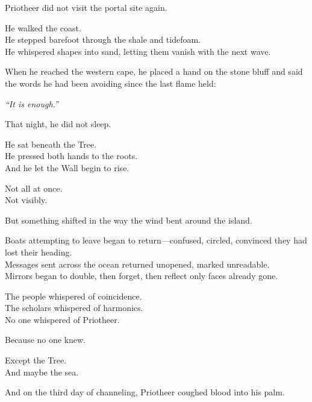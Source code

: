\documentclass[12pt]{article}
\begin{document}
\vspace{0.5em}
Priotheer did not visit the portal site again.

\vspace{0.5em}
He walked the coast.\\
He stepped barefoot through the shale and tidefoam.\\
He whispered shapes into sand, letting them vanish with the next wave.

\vspace{0.5em}
When he reached the western cape, he placed a hand on the stone bluff and said the words he had been avoiding since the last flame held:

\vspace{0.5em}
\textit{``It is enough.''}

\vspace{0.5em}
That night, he did not sleep.

\vspace{0.5em}
He sat beneath the Tree.\\
He pressed both hands to the roots.\\
And he let the Wall begin to rise.

\vspace{0.5em}
Not all at once.\\
Not visibly.

\vspace{0.5em}
But something shifted in the way the wind bent around the island.

\vspace{0.5em}
Boats attempting to leave began to return---confused, circled, convinced they had lost their heading.\\
Messages sent across the ocean returned unopened, marked unreadable.\\
Mirrors began to double, then forget, then reflect only faces already gone.

\vspace{0.5em}
The people whispered of coincidence.\\
The scholars whispered of harmonics.\\
No one whispered of Priotheer.

\vspace{0.5em}
Because no one knew.

\vspace{0.5em}
Except the Tree.\\
And maybe the sea.

\vspace{0.5em}
And on the third day of channeling, Priotheer coughed blood into his palm.
\end{document}
